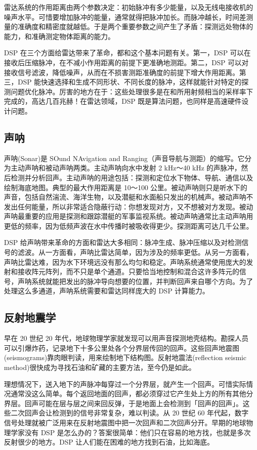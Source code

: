 雷达系统的作用距离由两个参数决定：初始脉冲有多少能量，以及无线电接收机的噪声水平。可惜要增加脉冲的能量，通常就得把脉冲加长。而脉冲越长，时间差测量的准确度和精密度就越低。于是两个重要参数之间产生了矛盾：探测远处物体的能力，和准确测定物体距离的能力。

DSP 在三个方面给雷达带来了革命，都和这个基本问题有关。第一，DSP
可以在接收后压缩脉冲，在不减小作用距离的前提下更准确地测距。第二，DSP
可以对接收信号滤波，降低噪声，从而在不损害测距准确度的前提下增大作用距离。第三，DSP
能快速选择和生成不同形状、不同长度的脉冲，这样就能针对特定的探测问题优化脉冲。厉害的地方在于：这些处理很多是在和所用射频相当的采样率下完成的，高达几百兆赫！在雷达领域，DSP
既是算法问题，也同样是高速硬件设计问题。

\subsection{声呐}

声呐(Sonar)是 SOund NAvigation and
Ranging（声音导航与测距）的缩写。它分为主动声呐和被动声呐两类。主动声呐向水中发射
2 kHz～40 kHz
的声脉冲，然后检测并分析回声。主动声呐的用途包括：探测和定位水下物体、导航、通信以及绘制海底地图。典型的最大作用距离是
10～100
公里。被动声呐则只是听水下的声音，包括自然湍流、海洋生物，以及潜艇和水面船只发出的机械声。被动声呐不发出任何能量，所以非常适合隐蔽行动：你想发现对方，又不想被对方发现。被动声呐最重要的应用是探测和跟踪潜艇的军事监视系统。被动声呐通常比主动声呐用更低的频率，因为低频声波在水中传播时被吸收得更少。探测距离可达几千公里。

DSP
给声呐带来革命的方面和雷达大多相同：脉冲生成、脉冲压缩以及对检测信号的滤波。从一方面看，声呐比雷达简单，因为涉及的频率更低。从另一方面看，声呐比雷达难，因为水下环境远没有那么均匀和稳定。声呐系统通常使用庞大的发射和接收阵元阵列，而不只是单个通道。只要恰当地控制和混合这许多阵元的信号，声呐系统就能把发出的脉冲导向想要的位置，并判断回声来自哪个方向。为了处理这么多通道，声呐系统需要和雷达同样庞大的
DSP 计算能力。

\subsection{反射地震学}

早在 20 世纪 20
年代，地球物理学家就发现可以用声音探测地壳结构。勘探人员可以引爆炸药，记录地下十多公里处各个分界层传回的回声。这些回声地震图(seismograms)靠肉眼判读，用来绘制地下结构图。反射地震法(reflection
seismic method)很快成为寻找石油和矿藏的主要方法，至今仍是如此。

理想情况下，送入地下的声脉冲每穿过一个分界层，就产生一个回声。可惜实际情况通常没这么简单。每个返回地面的回声，都必须穿过它产生处上方的所有其他分界层。回声可能在层与层之间来回反弹，于是地面上会检测到「回声的回声」。这些二次回声会让检测到的信号非常复杂，难以判读。从
20 世纪 60
年代起，数字信号处理就被广泛用来在反射地震图中把一次回声和二次回声分开。早期的地球物理学家没有
DSP
是怎么办的？答案很简单：他们只在容易的地方找，也就是多次反射很少的地方。DSP
让人们能在困难的地方找到石油，比如海底。

